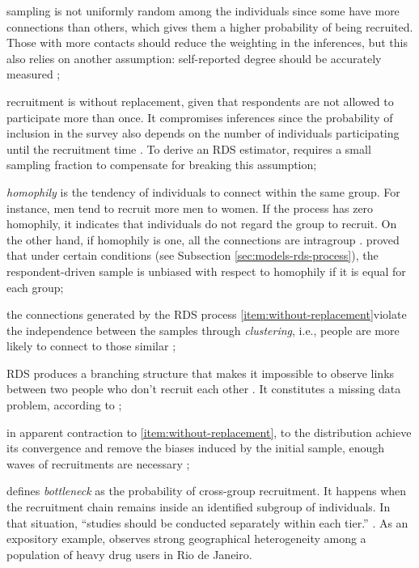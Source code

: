 \begin{alineas}
  \item sampling is not uniformly random among the individuals since some have more
  connections than others, which gives them a higher probability of being
  recruited. Those with more contacts should reduce the weighting in the
  inferences, but this also relies on another assumption: self-reported degree
  should be accurately measured \cite[p. 297]{gile2010respondent};
  
  \item \label{item:without-replacement} recruitment is without replacement, given that respondents are not
  allowed to participate more than once. It compromises inferences since the
  probability of inclusion in the survey also depends on the number of
  individuals participating until the recruitment time \cite[p.
  299]{gile2010respondent}. To derive an RDS estimator, 
  \textcite[p. 81]{volz2008probability} requires a small sampling fraction to
  compensate for breaking this assumption;

  \item {\em homophily} is the tendency of individuals to connect within the same
  group. For instance, men tend to recruit more men to women. If the process
  has zero homophily, it indicates that individuals do not regard the group to
  recruit. On the other hand, if homophily is one, all the connections are
  intragroup \cite[p. 20]{heckathorn2002}. \textcite[p. 21]{heckathorn2002} proved
  that under certain conditions (see Subsection \ref{sec:models-rds-process}),
  the respondent-driven sample is unbiased with respect to homophily if it is
  equal for each group;

  \item the connections generated by the RDS process  \autoref{item:without-replacement}violate the independence 
  between the samples through {\em clustering}, i.e., people are more likely 
  to connect to those similar \cite[p. 14]{avery2021statistical};
  
  \item RDS produces a branching structure that makes
  it impossible to observe links between two people who don't recruit each
  other \cite[p. 17]{gile2015network}. It constitutes a missing data problem, according to \textcite[p.
  190]{crawford2016};

  \item in apparent contraction to \autoref{item:without-replacement}, to
  the distribution achieve its convergence and remove the biases induced by
  the initial sample, enough waves of recruitments are necessary \cite[p. 186]{heckathorn1997};
  
  \item \textcite[p. 2225]{goel2009respondent} defines {\em bottleneck}
  as the probability of cross-group recruitment. It happens when the
  recruitment chain remains inside an identified subgroup of individuals. In that
  situation, ``studies should be conducted separately within each tier.''
  \cite[p. 75]{gile2018methods}. As an expository example,
  \textcite[p. S139]{toledo2011putting} observes strong geographical
  heterogeneity among a population of heavy drug users in Rio de Janeiro. 
\end{alineas}

